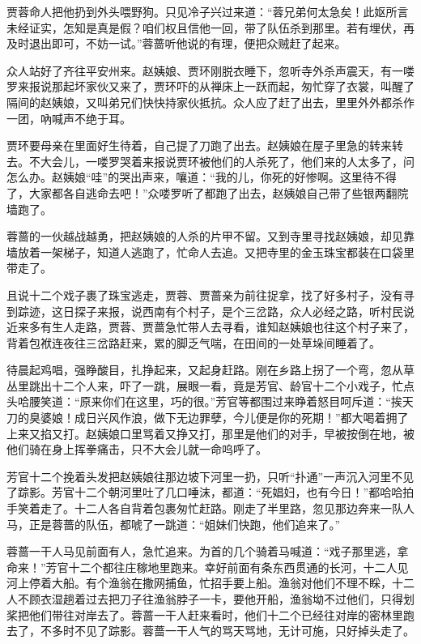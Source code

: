 \documentclass[12pt,oneside]{book}
\begin{document}
贾蓉命人把他扔到外头喂野狗。只见冷子兴过来道：“蓉兄弟何太急矣！此妪所言未经证实，怎知是真是假？咱们权且信他一回，带了队伍杀到那里。若有埋伏，再及时退出即可，不妨一试。”蓉蔷听他说的有理，便把众贼赶了起来。

众人站好了齐往平安州来。赵姨娘、贾环刚脱衣睡下，忽听寺外杀声震天，有一喽罗来报说那起坏家伙又来了，贾环吓的从禅床上一跃而起，匆忙穿了衣裳，叫醒了隔间的赵姨娘，又叫弟兄们快快持家伙抵抗。众人应了赶了出去，里里外外都杀作一团，吶喊声不绝于耳。

贾环要母亲在里面好生待着，自己提了刀跑了出去。赵姨娘在屋子里急的转来转去。不大会儿，一喽罗哭着来报说贾环被他们的人杀死了，他们来的人太多了，问怎么办。赵姨娘“哇”的哭出声来，嚷道：“我的儿，你死的好惨啊。这里待不得了，大家都各自逃命去吧！”众喽罗听了都跑了出去，赵姨娘自己带了些银两翻院墙跑了。

蓉蔷的一伙越战越勇，把赵姨娘的人杀的片甲不留。又到寺里寻找赵姨娘，却见靠墙放着一架梯子，知道人逃跑了，忙命人去追。又把寺里的金玉珠宝都装在口袋里带走了。

且说十二个戏子裹了珠宝逃走，贾蓉、贾蔷亲为前往捉拿，找了好多村子，没有寻到踪迹，这日探子来报，说西南有个村子，是个三岔路，众人必经之路，听村民说近来多有生人走路，贾蓉、贾蔷急忙带人去寻看，谁知赵姨娘也往这个村子来了，背着包袱连夜往三岔路赶来，累的脚乏气喘，在田间的一处草垛间睡着了。

待晨起鸡唱，强睁酸目，扎挣起来，又起身赶路。刚在乡路上拐了一个弯，忽从草丛里跳出十二个人来，吓了一跳，展眼一看，竟是芳官、龄官十二个小戏子，忙点头哈腰笑道：“原来你们在这里，巧的很。”芳官等都围过来睁着怒目呵斥道：“挨天刀的臭婆娘！成日兴风作浪，做下无边罪孽，今儿便是你的死期！”都大喝着拥了上来又掐又打。赵姨娘口里骂着又挣又打，那里是他们的对手，早被按倒在地，被他们骑在身上挥拳痛击，只不大会儿就一命呜呼了。

芳官十二个挽着头发把赵姨娘往那边坡下河里一扔，只听“扑通”一声沉入河里不见了踪影。芳官十二个朝河里吐了几口唾沫，都道：“死娼妇，也有今日！”都哈哈拍手笑着走了。十二人各自背着包裹匆忙赶路。刚走了半里路，忽见那边奔来一队人马，正是蓉蔷的队伍，都唬了一跳道：“姐妹们快跑，他们追来了。”

蓉蔷一干人马见前面有人，急忙追来。为首的几个骑着马喊道：“戏子那里逃，拿命来！”芳官十二个都往庄稼地里跑来。幸好前面有条东西贯通的长河，十二人见河上停着大船。有个渔翁在撒网捕鱼，忙招手要上船。渔翁对他们不理不睬，十二人不顾衣湿趟着过去把刀子往渔翁脖子一卡，要他开船，渔翁坳不过他们，只得划桨把他们带往对岸去了。蓉蔷一干人赶来看时，他们十二个已经往对岸的密林里跑去了，不多时不见了踪影。蓉蔷一干人气的骂天骂地，无计可施，只好掉头走了。
\end{document}
